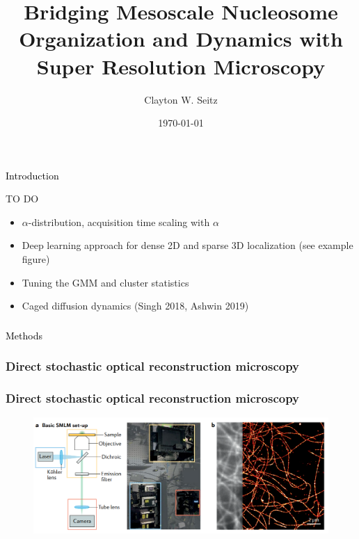 \documentclass{beamer}					%
\title{Bridging Mesoscale Nucleosome Organization and Dynamics with Super Resolution Microscopy}	%
\author{Clayton W. Seitz}								%
\date{\today}									%
\begin{document}
\begin{frame}
  \titlepage
\end{frame}


%


\begin{frame}
\frametitle{}
\centering
\Large \textcolor{black}{Introduction}
\end{frame}


\begin{frame}{TO DO}
\begin{itemize}
\item $\alpha$-distribution, acquisition time scaling with $\alpha$
\item Deep learning approach for dense 2D and sparse 3D localization (see example figure)
\item Tuning the GMM and cluster statistics
\item Caged diffusion dynamics (Singh 2018, Ashwin 2019)
\end{itemize}
\end{frame}


\begin{frame}
\frametitle{}
\centering
\Large \textcolor{black}{Methods}
\end{frame}



\begin{frame}
\frametitle{Direct stochastic optical reconstruction microscopy}

\end{frame}

\begin{frame}
\frametitle{Direct stochastic optical reconstruction microscopy}

\begin{figure}
\includegraphics[width=\textwidth]{Setup.png}
\end{figure}
  
\end{frame}
\end{document}
